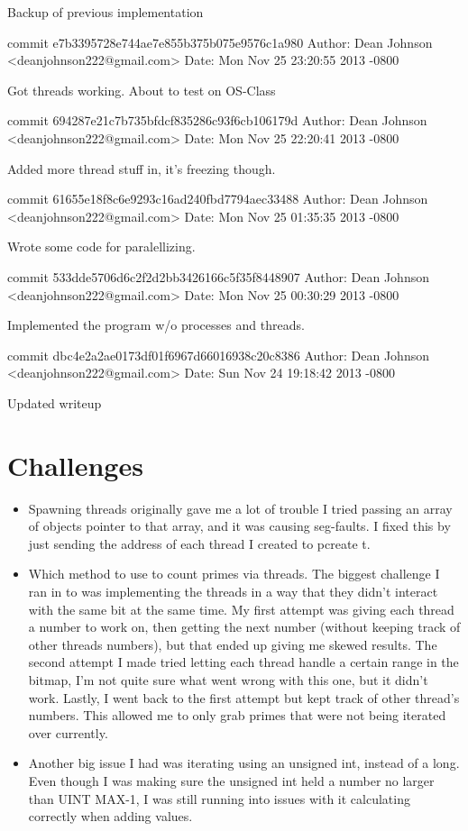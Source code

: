 \documentclass[fleqn,10pt,titlepage]{article}
\begin{document}
    Backup of previous implementation

commit e7b3395728e744ae7e855b375b075e9576c1a980
Author: Dean Johnson <deanjohnson222@gmail.com>
Date:   Mon Nov 25 23:20:55 2013 -0800

    Got threads working. About to test on OS-Class

commit 694287e21c7b735bfdcf835286c93f6cb106179d
Author: Dean Johnson <deanjohnson222@gmail.com>
Date:   Mon Nov 25 22:20:41 2013 -0800

    Added more thread stuff in, it's freezing though.

commit 61655e18f8c6e9293c16ad240fbd7794aec33488
Author: Dean Johnson <deanjohnson222@gmail.com>
Date:   Mon Nov 25 01:35:35 2013 -0800

    Wrote some code for paralellizing.

commit 533dde5706d6c2f2d2bb3426166c5f35f8448907
Author: Dean Johnson <deanjohnson222@gmail.com>
Date:   Mon Nov 25 00:30:29 2013 -0800

    Implemented the program w/o processes and threads.

commit dbc4e2a2ae0173df01f6967d66016938c20c8386
Author: Dean Johnson <deanjohnson222@gmail.com>
Date:   Sun Nov 24 19:18:42 2013 -0800

    Updated writeup

\clearpage

\section{Challenges}
\begin{itemize}
\item Spawning threads originally gave me a lot of trouble I tried passing an array of 
objects pointer to that array, and it was causing seg-faults. I fixed this by just sending 
the address of each thread I created to pcreate t.
\item Which method to use to count primes via threads. The biggest challenge I ran in to was
implementing the threads in a way that they didn't interact with the same bit at the same time.
My first attempt was giving each thread a number to work on, then getting the next number
(without keeping track of other threads numbers), but that ended up giving me skewed results.
The second attempt I made tried letting each thread handle a certain range in the bitmap, I'm
not quite sure what went wrong with this one, but it didn't work. Lastly, I went back to the
first attempt but kept track of other thread's numbers. This allowed me to only grab primes
that were not being iterated over currently.
\item Another big issue I had was iterating using an unsigned int, instead of a long. Even
though I was making sure the unsigned int held a number no larger than UINT MAX-1, I was 
still running into issues with it calculating correctly when adding values.
\end{itemize}
\clearpage
\end{document}
